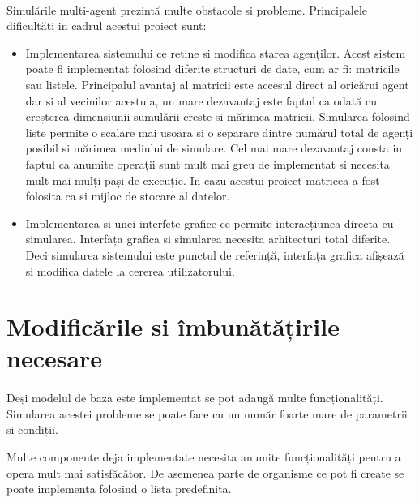 \documentclass[11pt ,A4]{article}
\begin{document}
        \paragraph{} 
            Simulările multi-agent prezintă multe obstacole si probleme.
            Principalele dificultăți in cadrul acestui proiect sunt:
        \begin{itemize}
            \item Implementarea sistemului ce retine si modifica starea agenților.
                Acest sistem poate fi implementat folosind diferite structuri de date, cum ar fi: matricile sau listele.
                Principalul avantaj al matricii este accesul direct al oricărui agent dar si al vecinilor acestuia, un mare dezavantaj este faptul ca odată cu creșterea dimensiunii sumulării creste si mărimea matricii.
                Simularea folosind liste permite o scalare mai ușoara si o separare dintre numărul total de agenți posibil si mărimea mediului de simulare.
                Cel mai mare dezavantaj consta in faptul ca anumite operații sunt mult mai greu de implementat si necesita mult mai mulți pași de execuție.
                In cazu acestui proiect matricea a fost folosita ca si mijloc de stocare al datelor.
            \item Implementarea si unei interfețe grafice ce permite interacțiunea directa cu simularea.
                Interfața grafica si simularea necesita arhitecturi total diferite.
                Deci simularea sistemului este punctul de referință, interfața grafica afișează si modifica datele la cererea utilizatorului.
        \end{itemize}

    \section{Modificările si îmbunătățirile necesare}
        \paragraph{}
            Deși modelul de baza este implementat se pot adaugă multe funcționalități.
            Simularea acestei probleme se poate face cu un număr foarte mare de parametrii si condiții. 

            Multe componente deja implementate necesita anumite funcționalități pentru a opera mult mai satisfăcător.
            De asemenea parte de organisme ce pot fi create se poate implementa folosind o lista predefinita.
\end{document}
